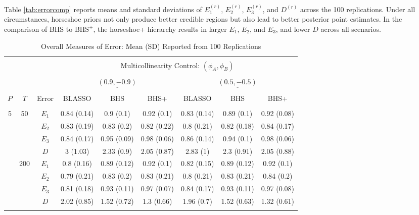 Table \ref{tab:errorcomp} reports means and standard deviations of $E^{(r)}_1$, $E^{(r)}_2$, $E^{(r)}_3$, and $D^{(r)}$ across the 100 replications. Under all circumstances, horseshoe priors not only produce better credible regions but also lead to better posterior point estimates. In the comparison of BHS to $\textrm{BHS}^+$, the horseshoe+ hierarchy  results in larger $E_1$, $E_2$, and $E_3$, and lower $D$ across all scenarios. 
\begin{table}[htbp]
\scriptsize
\centering
\caption{Overall Measures of Error: Mean (SD) Reported from 100 Replications}
\begin{tabular}{ccc|ccc|ccc}
  \hline
  \multicolumn{3}{c|}{} & \multicolumn{6}{c}{} \\ 
  & & & & \multicolumn{4}{c}{Multicollinearity Control: $(\phi_A,\phi_B)$} &  \\
  \multicolumn{3}{c|}{} & \multicolumn{6}{c}{} \\ 
   &  & & \multicolumn{3}{c}{$\underline{(0.9 ,-0.9)} $} & \multicolumn{3}{c}{$\underline{(0.5 ,-0.5)} $}   \\
 \multicolumn{3}{c|}{} & \multicolumn{6}{c}{} \\ 
 $P$ & $T$ & Error & BLASSO & BHS & BHS+ & BLASSO & BHS & BHS+ \\ 
  \hline
  \multicolumn{3}{c|}{} & \multicolumn{6}{c}{} \\ 
  \multirow{8}{*}{5} & \multirow{4}{*}{50} & $E_1$ & 0.84 (0.14) & 0.9 (0.1) & 0.92 (0.1) & 0.83 (0.14) & 0.89 (0.1) & 0.92 (0.08) \\ 
  & & $E_2$ & 0.83 (0.19) & 0.83 (0.2) & 0.82 (0.22) & 0.8 (0.21) & 0.82 (0.18) & 0.84 (0.17) \\ 
  & & $E_3$ & 0.84 (0.17) & 0.95 (0.09) & 0.98 (0.06) & 0.86 (0.14) & 0.94 (0.1) & 0.98 (0.06) \\ 
  & & $D$ & 3 (1.03) & 2.33 (0.9) & 2.05 (0.87) & 2.83 (1) & 2.3 (0.91) & 2.05 (0.88) \\ 
  & \multirow{4}{*}{200} & $E_1$ & 0.8 (0.16) & 0.89 (0.12) & 0.92 (0.1) & 0.82 (0.15) & 0.89 (0.12) & 0.92 (0.1) \\ 
  & & $E_2$ & 0.79 (0.21) & 0.83 (0.2) & 0.83 (0.21) & 0.8 (0.21) & 0.83 (0.21) & 0.84 (0.2) \\ 
  & & $E_3$ & 0.81 (0.18) & 0.93 (0.11) & 0.97 (0.07) & 0.84 (0.17) & 0.93 (0.11) & 0.97 (0.08) \\ 
  & & $D$ & 2.02 (0.85) & 1.52 (0.72) & 1.3 (0.66) & 1.96 (0.7) & 1.52 (0.63) & 1.32 (0.61) \\ 
  \multicolumn{3}{c|}{} & \multicolumn{6}{c}{} \\ 

\end{tabular}
\end{table}
